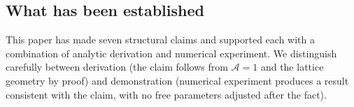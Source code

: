 
\label{sec:conclusion}

\subsection*{What has been established}

This paper has made seven structural claims and supported each with a
combination of analytic derivation and numerical experiment.
We distinguish carefully between derivation (the claim follows from
$\mathcal{A}=1$ and the lattice geometry by proof) and demonstration
(numerical experiment produces a result consistent with the claim, with
no free parameters adjusted after the fact).

